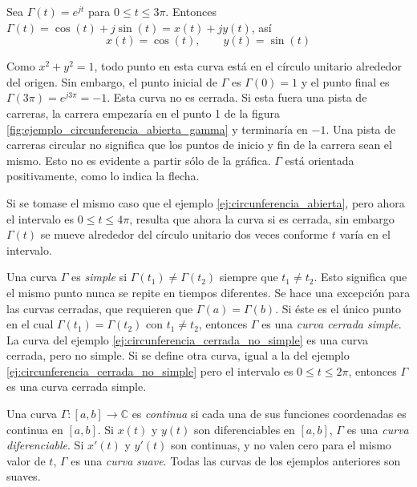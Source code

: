 \begin{example}
  Sea $\Gamma(t)=e^{jt}$ para $0\leqslant t \leqslant 3\pi$. Entonces $\Gamma(t)=\cos(t)+j\sin(t)=x(t)+jy(t)$, así
  \begin{equation*}
    x(t)=\cos(t),\qquad y(t)=\sin(t)
  \end{equation*}

  

  Como $x^2+y^2=1$, todo punto en esta curva está en el círculo unitario alrededor del origen. Sin embargo, el punto inicial de $\Gamma$ es $\Gamma(0)=1$ y el punto final es $\Gamma(3\pi)=e^{j3\pi}=-1$. Esta curva no es cerrada. Si esta fuera una pista de carreras, la carrera empezaría en el punto 1 de la figura \ref{fig:ejemplo_circunferencia_abierta_gamma} y terminaría en $-1$. Una pista de carreras circular no significa que los puntos de inicio y fin de la carrera sean el mismo. Esto no es evidente a partir sólo de la gráfica. $\Gamma$ está orientada positivamente, como lo indica la flecha.
  \label{ej:circunferencia_abierta}
\end{example}
\begin{example}
  Si se tomase el mismo caso que el ejemplo \ref{ej:circunferencia_abierta}, pero ahora el intervalo es $0\leqslant t \leqslant 4\pi$, resulta que ahora la curva si es cerrada, sin embargo $\Gamma(t)$ se mueve alrededor del círculo unitario dos veces conforme $t$ varía en el intervalo.
  \label{ej:circunferencia_cerrada_no_simple}
\end{example}

Una curva $\Gamma$ es \textit{simple} si $\Gamma(t_1)\neq \Gamma(t_2)$ siempre que $t_1\neq t_2$. Esto significa que el mismo punto nunca se repite en tiempos diferentes. Se hace una excepción para las curvas cerradas, que requieren que $\Gamma(a)=\Gamma(b)$. Si éste es el único punto en el cual $\Gamma(t_1)=\Gamma(t_2)$ con $t_1\neq t_2$, entonces $\Gamma$ es una \textit{curva cerrada simple}. La curva del ejemplo \ref{ej:circunferencia_cerrada_no_simple} es una curva cerrada, pero no simple. Si se define otra curva, igual a la del ejemplo \ref{ej:circunferencia_cerrada_no_simple} pero el intervalo es $0\leqslant t \leqslant 2\pi$, entonces $\Gamma$ es una curva cerrada simple.

Una curva $\Gamma:[a,b]\to \mathbb{C}$ es \textit{continua} si cada una de sus funciones coordenadas es continua en $[a,b]$. Si $x(t)$ y $y(t)$ son diferenciables en $[a,b]$, $\Gamma$ es una \textit{curva diferenciable}. Si $x'(t)$ y $y'(t)$ son continuas, y no valen cero para el mismo valor de $t$, $\Gamma$ es una \textit{curva suave}. Todas las curvas de los ejemplos anteriores son suaves.

